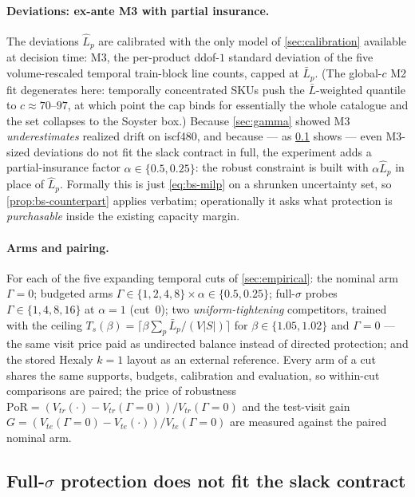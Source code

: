 \paragraph{Deviations: ex-ante M3 with partial insurance.}
The deviations $\hat L_p$ are calibrated with the only model of
\cref{sec:calibration} available at decision time: M3, the per-product
ddof-$1$ standard deviation of the five volume-rescaled temporal train-block
line counts, capped at $\bar L_p$. (The global-$c$ M2 fit degenerates here:
temporally concentrated SKUs push the $\bar L$-weighted quantile to
$c \approx 70$--$97$, at which point the cap binds for essentially the whole
catalogue and the set collapses to the Soyster box.) Because
\cref{sec:gamma} showed M3 \emph{underestimates} realized drift on iscf480,
and because --- as \cref{sec:exp-impl} shows --- even M3-sized deviations do
not fit the slack contract in full, the experiment adds a partial-insurance
factor $\alpha \in \{0.5, 0.25\}$: the robust constraint is built with
$\alpha \hat L_p$ in place of $\hat L_p$. Formally this is just
\cref{eq:bs-milp} on a shrunken uncertainty set, so
\cref{prop:bs-counterpart} applies verbatim; operationally it asks what
protection is \emph{purchasable} inside the existing capacity margin.

\paragraph{Arms and pairing.}
For each of the five expanding temporal cuts of \cref{sec:empirical}:
the nominal arm $\Gamma = 0$; budgeted arms
$\Gamma \in \{1, 2, 4, 8\} \times \alpha \in \{0.5, 0.25\}$; full-$\sigma$
probes $\Gamma \in \{1, 4, 8, 16\}$ at $\alpha = 1$ (cut~0); two
\emph{uniform-tightening} competitors, trained with the ceiling
$T_s(\beta) = \lceil \beta \sum_p \bar L_p / (V |S|) \rceil$ for
$\beta \in \{1.05, 1.02\}$ and $\Gamma = 0$ --- the same visit price paid as
undirected balance instead of directed protection; and the stored Hexaly
$k{=}1$ layout as an external reference. Every arm of a cut shares the same
supports, budgets, calibration and evaluation, so within-cut comparisons are
paired; the price of robustness $\mathrm{PoR} = (V_{tr}(\cdot) -
V_{tr}(\Gamma{=}0))/V_{tr}(\Gamma{=}0)$ and the test-visit gain
$G = (V_{te}(\Gamma{=}0) - V_{te}(\cdot))/V_{te}(\Gamma{=}0)$ are measured
against the paired nominal arm.

\subsection{Full-\texorpdfstring{$\sigma$}{sigma} protection does not fit the slack contract}
\label{sec:exp-impl}

